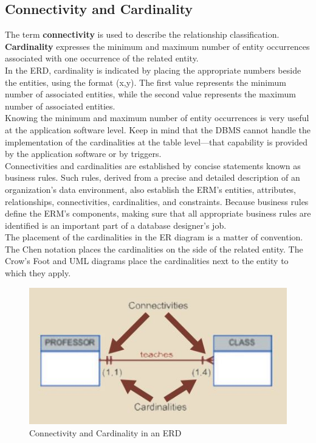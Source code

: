 \documentclass[a4paper, 12pt, titlepage]{report}
\begin{document}
{\subsection{Connectivity and Cardinality}
The term \textbf{connectivity} is used to describe the relationship classification. \textbf{Cardinality} expresses the minimum and maximum number of entity occurrences associated with one occurrence of the related entity. \\In the ERD, cardinality is indicated by placing the appropriate numbers beside the entities, using the format (x,y). The first value represents the minimum number of associated entities, while the second value represents the maximum number of associated entities. \\Knowing the minimum and maximum number of entity occurrences is very useful at the application software level. Keep in mind that the DBMS cannot handle the implementation of the cardinalities at the table level—that capability is provided by the application software or by triggers. \\Connectivities and cardinalities are established by concise statements known as business rules. Such rules, derived from a precise and detailed description of an organization’s data environment, also establish the ERM’s entities, attributes, relationships, connectivities, cardinalities, and constraints. Because business rules define the ERM’s components, making sure that all appropriate business rules are identified is an important part of a database designer’s job.\\ The placement of the cardinalities in the ER diagram is a matter of convention. The Chen notation places the cardinalities on the side of the related entity. The Crow’s Foot and UML diagrams place the cardinalities next to the entity to which they apply.
\begin{figure}[H]
\centering
\includegraphics[scale=0.8]{ConnCard}
\caption{Connectivity and Cardinality in an ERD}
\end{figure}

}
\end{document}
